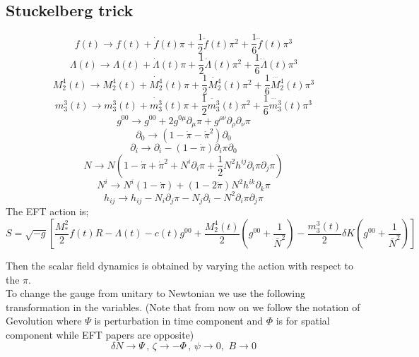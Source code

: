 \documentclass[a4paper,11pt]{article}
\def\be{\begin{equation}}
\def\ee{\end{equation}}
\begin{document}
 \subsection{Stuckelberg trick}
\be
f(t) \longrightarrow f(t) +  \dot{f} (t) \pi+ \frac{1}{2} \ddot{f }(t) \pi^2  + \frac{1}{6} \dddot{f }(t) \pi^3
\ee
\be
\Lambda(t) \longrightarrow \Lambda(t) +  \dot{\Lambda} (t) \pi+ \frac{1}{2} \ddot{\Lambda}(t) \pi^2 + \frac{1}{6} \dddot{\Lambda }(t) \pi^3
\ee
\be
M_2^4(t) \longrightarrow M_2^4(t) +  \dot{ M_2^4} (t) \pi+ \frac{1}{2}    \ddot{ M_2^4 }(t)  \pi^2 + \frac{1}{6} \dddot{M_2^4 }(t) \pi^3
\ee
\be
m_3^3(t) \longrightarrow m_3^3(t) +  \dot{m_3^3} (t) \pi+ \frac{1}{2} \ddot{m_3^3}(t) \pi^2 + \frac{1}{6} \dddot{m_3^3 }(t) \pi^3
\ee
\be
g^{00} \longrightarrow g^{00} + 2 g^{0 \mu} \partial_{\mu} \pi + g^{\rho \nu} \partial_{\rho} \partial_{\nu} \pi
\ee
\be
\partial_0 \longrightarrow \left( 1- \dot{\pi} - \dot{\pi}^2\right) \partial_0
\ee
\be
\partial_i \longrightarrow \partial_i-  \left( 1- \dot{\pi} \right) \partial_i \pi \partial_0
\ee
\be
N \longrightarrow N \left(1-\dot{\pi} + \dot{\pi}^2+N^i\partial_i \pi + \frac{1}{2} N^2 h^{ij} \partial_i \pi \partial_j \pi \right)
\ee
\be
N^i \longrightarrow N^i(1- \dot{\pi} ) +(1- 2 \dot{\pi}) N^2 h^{ik} \partial_k \pi
\ee
\be
h_{ij} \longrightarrow h_{ij}- N_i \partial_j \pi -N_j \partial_i - N^2\partial_i \pi \partial_j \pi
\ee
The EFT action is;
\be
S=\sqrt{-g} \left [ \frac{M_*^2}{2} f(t) R -\Lambda (t) -c(t) g^{00} +\frac{M_2^4(t)}{2} \left (g^{00} + \frac{1}{\bar{N}^2} \right )    -  \frac{m_3^3(t)}{2} \delta K  \left (g^{00} + \frac{1}{\bar{N}^2} \right )    \right ]
\ee

  Then the scalar field dynamics is obtained by varying the action with respect to the $\pi$. \\
  To change the gauge from unitary to Newtonian we use the following transformation in the variables. (Note that from now on we follow the notation of Gevolution where $\Psi$ is perturbation in time component and $\Phi$ is for spatial component while EFT papers are opposite)
 \be
 \delta N \rightarrow \Psi \, , \, \zeta \rightarrow-\Phi \, , \, \psi   \rightarrow0,  \,  \,  B \rightarrow0
 \ee
\end{document}
